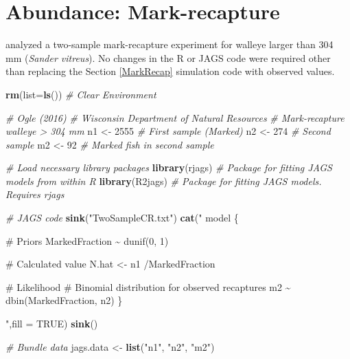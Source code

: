 \documentclass[
]{krantz}
\makeatletter
\newenvironment{Shaded}{\begin{snugshade}}{\end{snugshade}}
\newcommand{\AttributeTok}[1]{\textcolor[rgb]{0.27,0.27,0.27}{#1}}
\newcommand{\CommentTok}[1]{\textcolor[rgb]{0.37,0.37,0.37}{\textit{#1}}}
\newcommand{\ConstantTok}[1]{\textcolor[rgb]{0.37,0.37,0.37}{#1}}
\newcommand{\DecValTok}[1]{\textcolor[rgb]{0.06,0.06,0.06}{#1}}
\newcommand{\FunctionTok}[1]{\textcolor[rgb]{0.27,0.27,0.27}{\textbf{#1}}}
\newcommand{\NormalTok}[1]{#1}
\newcommand{\OtherTok}[1]{\textcolor[rgb]{0.37,0.37,0.37}{#1}}
\newcommand{\StringTok}[1]{\textcolor[rgb]{0.5,0.5,0.5}{#1}}
\newenvironment{kframe}{%
\medskip{}
\setlength{\fboxsep}{.8em}
 \def\at@end@of@kframe{}%
 \ifinner\ifhmode%
  \def\at@end@of@kframe{\end{minipage}}%
  \begin{minipage}{\columnwidth}%
 \fi\fi%
 \def\FrameCommand##1{\hskip\@totalleftmargin \hskip-\fboxsep
 \colorbox{shadecolor}{##1}\hskip-\fboxsep
     \hskip-\linewidth \hskip-\@totalleftmargin \hskip\columnwidth}%
 \MakeFramed {\advance\hsize-\width
   \@totalleftmargin\z@ \linewidth\hsize
   \@setminipage}}%
 {\par\unskip\endMakeFramed%
 \at@end@of@kframe}
\renewenvironment{Shaded}{\begin{kframe}}{\end{kframe}}
\makeatother
\begin{document}
\hypertarget{MarkRecapRealData}{%
\section{Abundance: Mark-recapture}\label{MarkRecapRealData}}

\citet{ogle_2016} analyzed a two-sample mark-recapture experiment for walleye larger than 304 mm (\emph{Sander vitreus}). No changes in the R or JAGS code were required other than replacing the Section \ref{MarkRecap} simulation code with observed values.

\begin{Shaded}
\begin{Highlighting}[]
\FunctionTok{rm}\NormalTok{(}\AttributeTok{list=}\FunctionTok{ls}\NormalTok{()) }\CommentTok{\# Clear Environment}

\CommentTok{\# Ogle (2016)}
\CommentTok{\# Wisconsin Department of Natural Resources}
\CommentTok{\# Mark{-}recapture walleye \textgreater{} 304 mm}
\NormalTok{n1 }\OtherTok{\textless{}{-}} \DecValTok{2555} \CommentTok{\# First sample (Marked)}
\NormalTok{n2 }\OtherTok{\textless{}{-}} \DecValTok{274} \CommentTok{\# Second sample}
\NormalTok{m2 }\OtherTok{\textless{}{-}} \DecValTok{92} \CommentTok{\# Marked fish in second sample}

\CommentTok{\# Load necessary library packages}
\FunctionTok{library}\NormalTok{(rjags)   }\CommentTok{\# Package for fitting JAGS models from within R}
\FunctionTok{library}\NormalTok{(R2jags)  }\CommentTok{\# Package for fitting JAGS models. Requires rjags}

\CommentTok{\# JAGS code}
\FunctionTok{sink}\NormalTok{(}\StringTok{"TwoSampleCR.txt"}\NormalTok{)}
\FunctionTok{cat}\NormalTok{(}\StringTok{"}
\StringTok{    model \{}

\StringTok{    \# Priors}
\StringTok{    MarkedFraction \textasciitilde{} dunif(0, 1)}

\StringTok{    \# Calculated value}
\StringTok{    N.hat \textless{}{-} n1 /MarkedFraction}

\StringTok{    \# Likelihood}
\StringTok{    \# Binomial distribution for observed recaptures}
\StringTok{    m2 \textasciitilde{} dbin(MarkedFraction, n2)}
\StringTok{    \}}

\StringTok{    "}\NormalTok{,}\AttributeTok{fill =} \ConstantTok{TRUE}\NormalTok{)}
\FunctionTok{sink}\NormalTok{()}

\CommentTok{\# Bundle data}
\NormalTok{jags.data }\OtherTok{\textless{}{-}} \FunctionTok{list}\NormalTok{(}\StringTok{"n1"}\NormalTok{, }\StringTok{"n2"}\NormalTok{, }\StringTok{"m2"}\NormalTok{)}


\end{Highlighting}
\end{Shaded}
\end{document}
